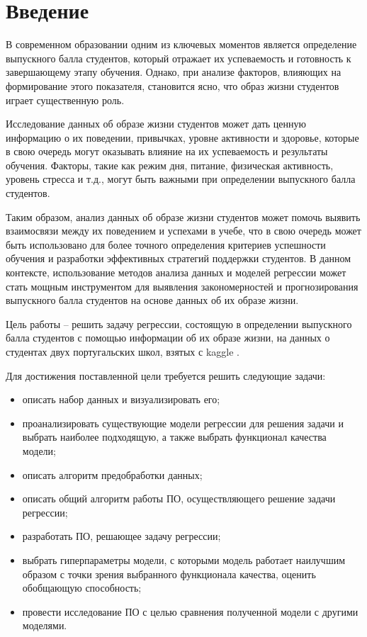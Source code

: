 \chapter*{Введение}

В современном образовании одним из ключевых моментов является определение выпускного балла студентов, который отражает их успеваемость и готовность к завершающему этапу обучения. Однако, при анализе факторов, влияющих на формирование этого показателя, становится ясно, что образ жизни студентов играет существенную роль.

Исследование данных об образе жизни студентов может дать ценную информацию о их поведении, привычках, уровне активности и здоровье, которые в свою очередь могут оказывать влияние на их успеваемость и результаты обучения. Факторы, такие как режим дня, питание, физическая активность, уровень стресса и т.д., могут быть важными при определении выпускного балла студентов.

Таким образом, анализ данных об образе жизни студентов может помочь выявить взаимосвязи между их поведением и успехами в учебе, что в свою очередь может быть использовано для более точного определения критериев успешности обучения и разработки эффективных стратегий поддержки студентов. В данном контексте, использование методов анализа данных и моделей регрессии может стать мощным инструментом для выявления закономерностей и прогнозирования выпускного балла студентов на основе данных об их образе жизни.

Цель работы -- решить задачу регрессии, состоящую в определении выпускного балла студентов с помощью информации об их образе жизни, на данных о студентах двух португальских школ, взятых с kaggle \cite{bib:kaggle}.

Для достижения поставленной цели требуется решить следующие задачи:

\begin{itemize}
    \item описать набор данных и визуализировать его;
    \item проанализировать существующие модели регрессии для решения задачи и выбрать наиболее подходящую, а также выбрать функционал качества модели;
    \item описать алгоритм предобработки данных;
    \item описать общий алгоритм работы ПО, осуществляющего решение задачи регрессии;
    \item разработать ПО, решающее задачу регрессии;
    \item выбрать гиперпараметры модели, с которыми модель работает наилучшим образом с точки зрения выбранного функционала качества, оценить обобщающую способность;
    \item провести исследование ПО с целью сравнения полученной модели с другими моделями.
\end{itemize}
